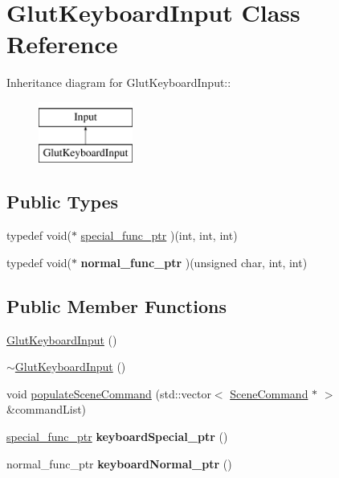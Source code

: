 \hypertarget{class_glut_keyboard_input}{
\section{GlutKeyboardInput Class Reference}
\label{class_glut_keyboard_input}
}
Inheritance diagram for GlutKeyboardInput::\begin{figure}[H]
\begin{center}
\leavevmode
\includegraphics[height=2cm]{class_glut_keyboard_input}
\end{center}
\end{figure}
\subsection*{Public Types}
\begin{DoxyCompactItemize}
\item 
typedef void($\ast$ \hyperlink{class_glut_keyboard_input_aec1d7be46aca658f1fc7303e32ff4b62}{special\_\-func\_\-ptr} )(int, int, int)
\item 
\hypertarget{class_glut_keyboard_input_a528018e634a90de0eb525f997c147511}{
typedef void($\ast$ {\bfseries normal\_\-func\_\-ptr} )(unsigned char, int, int)}
\label{class_glut_keyboard_input_a528018e634a90de0eb525f997c147511}

\end{DoxyCompactItemize}
\subsection*{Public Member Functions}
\begin{DoxyCompactItemize}
\item 
\hyperlink{class_glut_keyboard_input_a68f755baae4426cb2004686918499d0a}{GlutKeyboardInput} ()
\item 
\hyperlink{class_glut_keyboard_input_ada68b75e8cf17723f1515fb7b996622e}{$\sim$GlutKeyboardInput} ()
\item 
void \hyperlink{class_glut_keyboard_input_a820e8803532b4fa2257a44c4ece6701a}{populateSceneCommand} (std::vector$<$ \hyperlink{class_scene_command}{SceneCommand} $\ast$ $>$ \&commandList)
\item 
\hypertarget{class_glut_keyboard_input_aed6aaccb7d8a9a0ed511d6b620c99893}{
\hyperlink{class_glut_keyboard_input_aec1d7be46aca658f1fc7303e32ff4b62}{special\_\-func\_\-ptr} {\bfseries keyboardSpecial\_\-ptr} ()}
\label{class_glut_keyboard_input_aed6aaccb7d8a9a0ed511d6b620c99893}

\item 
\hypertarget{class_glut_keyboard_input_ac1467d3f12d32201d245dde228688348}{
normal\_\-func\_\-ptr {\bfseries keyboardNormal\_\-ptr} ()}
\label{class_glut_keyboard_input_ac1467d3f12d32201d245dde228688348}

\end{DoxyCompactItemize}
